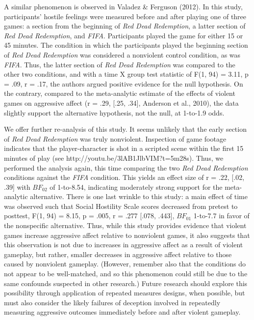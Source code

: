 \documentclass[fignum,nobf,man]{apa}
\begin{document}
A similar phenomenon is observed in Valadez \& Ferguson (2012). 
In this study, participants’ hostile feelings were measured before and after playing one of three games: a section from the beginning of \textit{Red Dead Redemption}, a latter section of \textit{Red Dead Redemption}, and \textit{FIFA}. %
Participants played the game for either 15 or 45 minutes. The condition in which the participants played the beginning section of \textit{Red Dead Redemption} was considered a nonviolent control condition, as was \textit{FIFA}. Thus, the latter section of \textit{Red Dead Redemption} was compared to the other two conditions, and with a time X group test statistic of F(1, 94) = 3.11, p = .09, r = .17, the authors argued positive evidence for the null hypothesis. On the contrary, compared to the meta-analytic estimate of the effects of violent games on aggressive affect (r = .29, [.25, .34], Anderson et al., 2010), the data slightly support the alternative hypothesis, not the null, at 1-to-1.9 odds. 

We offer further re-analysis of this study. It seems unlikely that the early section of \textit{Red Dead Redemption} was truly nonviolent. Inspection of game footage indicates that the player-character is shot in a scripted scene within the first 15 minutes of play (see http://youtu.be/3lAB1JlbVIM?t=5m28s). Thus, we performed the analysis again, this time comparing the two \textit{Red Dead Redemption} conditions against the \textit{FIFA} condition. This yields an effect size of r = .22, [.02, .39]  with  $BF_{02}$ of 1-to-8.54, indicating moderately strong support for the meta-analytic alternative. There is one last wrinkle to this study: a main effect of time was observed such that Social Hostility Scale scores decreased from pretest to posttest, F(1, 94) = 8.15, p = .005, r = .277 [.078, .443], $BF_{01}$ 1-to-7.7 in favor of the nonspecific alternative. Thus, while this study provides evidence that violent games increase aggressive affect relative to nonviolent games, it also suggests that this observation is not due to increases in aggressive affect as a result of violent gameplay, but rather, smaller decreases in aggressive affect relative to those caused by nonviolent gameplay. (However, remember also that the conditions do not appear to be well-matched, and so this phenomenon could still be due to the same confounds suspected in other research.) Future research should explore this possibility through application of repeated measures designs, when possible, but must also consider the likely failures of deception involved in repeatedly measuring aggressive outcomes immediately before and after violent gameplay.
\end{document}
